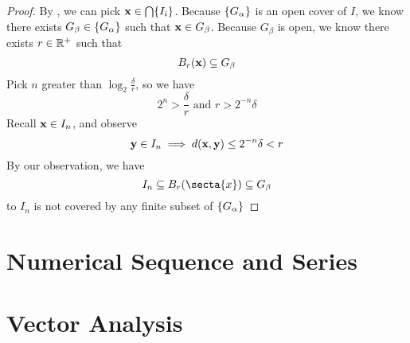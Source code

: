 \documentclass{report}
\begin{document}
\begin{proof}
By , we can pick $\textbf{x}\in \bigcap \{ I_i \}$. Because $\{ G_\alpha  \}$ is an open cover of $I$, we know there exists $G_\beta \in \{ G_\alpha  \}$ such that $\textbf{x}\in G_\beta $. Because $G_\beta $ is open, we know there exists $r\in\mathbb{R}^+$ such that
\begin{equation}
B_r(\textbf{x})\subseteq G_\beta 
\end{equation}
Pick $n$ greater than $\log_2 \frac{\delta}{r}$, so we have
 \begin{equation}
2^n>\frac{\delta}{r}\text{ and }r>2^{-n}\delta
\end{equation}
Recall $\textbf{x}\in I_n$, and observe
\begin{equation}
\textbf{y}\in I_n\implies d(\textbf{x},\textbf{y})\leq 2^{-n}\delta<r
\end{equation}
By our observation, we have
\begin{equation}
I_n \subseteq B_r(\secta{x})\subseteq G_{\beta }
\end{equation}
\CaC to $I_n$ is not covered by any finite subset of $\{ G_\alpha  \}$
\end{proof}
\chapter{Numerical Sequence and Series}
\chapter{Vector Analysis}
\end{document}
